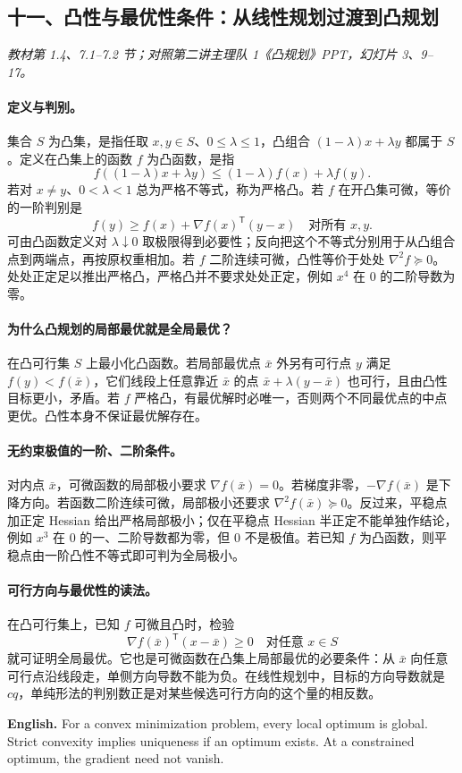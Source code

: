 \documentclass[UTF8,11pt,a4paper]{ctexart}
\newcommand{\EN}[1]{\par\noindent \textbf{English.} #1\par}
\begin{document}
\clearpage
\subsection*{十一、凸性与最优性条件：从线性规划过渡到凸规划}
\noindent\textit{教材第 1.4、7.1--7.2 节；对照第二讲主理队 1《凸规划》PPT，幻灯片 3、9--17。}
\paragraph{定义与判别。}
集合 $S$ 为凸集，是指任取 $x,y\in S$、$0\le\lambda\le1$，凸组合 $(1-\lambda)x+\lambda y$ 都属于 $S$。定义在凸集上的函数 $f$ 为凸函数，是指
\[
f((1-\lambda)x+\lambda y)\le(1-\lambda)f(x)+\lambda f(y).
\]
若对 $x\ne y$、$0<\lambda<1$ 总为严格不等式，称为严格凸。若 $f$ 在开凸集可微，等价的一阶判别是
\[
 f(y)\ge f(x)+\nabla f(x)^{\mathsf T}(y-x)\quad\text{对所有 }x,y.
\]
可由凸函数定义对 $\lambda\downarrow0$ 取极限得到必要性；反向把这个不等式分别用于从凸组合点到两端点，再按原权重相加。若 $f$ 二阶连续可微，凸性等价于处处 $\nabla^2 f\succeq0$。处处正定足以推出严格凸，严格凸并不要求处处正定，例如 $x^4$ 在 $0$ 的二阶导数为零。

\paragraph{为什么凸规划的局部最优就是全局最优？}
在凸可行集 $S$ 上最小化凸函数。若局部最优点 $\bar x$ 外另有可行点 $y$ 满足 $f(y)<f(\bar x)$，它们线段上任意靠近 $\bar x$ 的点 $\bar x+\lambda(y-\bar x)$ 也可行，且由凸性目标更小，矛盾。若 $f$ 严格凸，有最优解时必唯一，否则两个不同最优点的中点更优。凸性本身不保证最优解存在。

\paragraph{无约束极值的一阶、二阶条件。}
对内点 $\bar x$，可微函数的局部极小要求 $\nabla f(\bar x)=0$。若梯度非零，$-\nabla f(\bar x)$ 是下降方向。若函数二阶连续可微，局部极小还要求 $\nabla^2f(\bar x)\succeq0$。反过来，平稳点加正定 Hessian 给出严格局部极小；仅在平稳点 Hessian 半正定不能单独作结论，例如 $x^3$ 在 $0$ 的一、二阶导数都为零，但 $0$ 不是极值。若已知 $f$ 为凸函数，则平稳点由一阶凸性不等式即可判为全局极小。

\paragraph{可行方向与最优性的读法。}
在凸可行集上，已知 $f$ 可微且凸时，检验
\[
\nabla f(\bar x)^{\mathsf T}(x-\bar x)\ge0\quad\text{对任意 }x\in S
\]
就可证明全局最优。它也是可微函数在凸集上局部最优的必要条件：从 $\bar x$ 向任意可行点沿线段走，单侧方向导数不能为负。在线性规划中，目标的方向导数就是 $cq$，单纯形法的判别数正是对某些候选可行方向的这个量的相反数。
\EN{For a convex minimization problem, every local optimum is global. Strict convexity implies uniqueness if an optimum exists. At a constrained optimum, the gradient need not vanish.}
\end{document}
